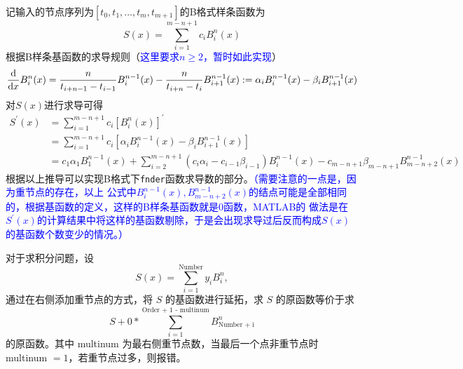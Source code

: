 记输入的节点序列为$[t_0,t_1,\dots,t_m,t_{m+1}]$的B格式样条函数为
\begin{equation}
  \label{eq:given-b-spline-fnder}
  S(x) = \sum_{i=1}^{m-n+1} c_i B_i^{n}(x)
\end{equation}
根据B样条基函数的求导规则（\textcolor{blue}{这里要求$n \geq 2$，暂时如此实现}）
\begin{equation}
  \label{eq:derivatives-of-a-basis}
  \frac{\mathrm{d} }{\mathrm{d} x} B_i^n(x) = \frac{n}{t_{i+n-1} -t_{i-1}} B_i^{n-1}(x) - \frac{n}{t_{i+n} -t_i}B_{i+1}^{n-1}(x)
  := \alpha_i B_i^{n-1}(x) - \beta_i B_{i+1}^{n-1}(x)
\end{equation}
对$S(x)$进行求导可得
\begin{equation}
  \begin{aligned}
    S^\prime(x) &= \sum_{i=1}^{m-n+1} c_i \left[B_i^{n}(x)\right]^\prime \\
                &= \sum_{i=1}^{m-n+1} c_i \left[\alpha_i B_i^{n-1}(x) - \beta_i B_{i+1}^{n-1}(x)\right] \\
                &= c_1 \alpha_1 B_1^{n-1}(x) + \sum_{i=2}^{m-n+1}(c_i \alpha_i -c_{i-1}\beta_{i-1})B_{i}^{n-1}(x) 
                  - c_{m-n+1} \beta_{m-n+1} B_{m-n+2}^{n-1}(x)
  \end{aligned}
\end{equation}
根据以上推导可以实现B格式下\texttt{fnder}函数求导数的部分。\textcolor{blue}{\kaishu（需要注意的一点是，因为重节点的存在，以上
  公式中$B_{i}^{n-1}(x),B_{m-n+2}^{n-1}(x)$的结点可能是全部相同的，根据基函数的定义，这样的B样条基函数就是0函数，MATLAB的
  做法是在$S^\prime(x)$的计算结果中将这样的基函数剔除，于是会出现求导过后反而构成$S(x)$的基函数个数变少的情况。）}

对于求积分问题，设
\[
  S(x) = \sum_{i=1}^{\text{Number}} y_i B_i^{n},
\]
通过在右侧添加重节点的方式，将 $S$ 的基函数进行延拓，求 $S$ 的原函数等价于求
\[
  S + 0 * \sum_{i=1}^{\text{Order + 1 - multinum}} B_{\text{Number + i}}^{n}
\]
的原函数。其中 multinum 为最右侧重节点数，当最后一个点非重节点时 multinum $=1$，若重节点过多，则报错。

